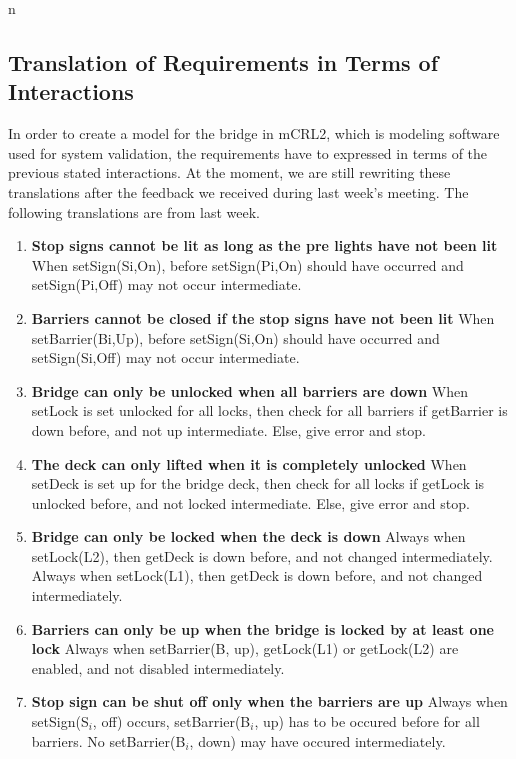 n\subsection{Translation of Requirements in Terms of Interactions}

In order to create a model for the bridge in mCRL2, which is modeling software used for system validation, the requirements have to expressed in terms of the previous stated interactions. At the moment, we are still rewriting these translations after the feedback we received during last week's meeting. The following translations are from last week.

\begin{enumerate}
	\item \textbf{Stop signs cannot be lit as long as the pre lights have not been lit}
	When setSign(Si,On), before setSign(Pi,On) should have occurred and setSign(Pi,Off) may not occur intermediate.

	\item \textbf{Barriers cannot be closed if the stop signs have not been lit}
	When setBarrier(Bi,Up), before setSign(Si,On) should have occurred and setSign(Si,Off) may not occur intermediate.

	\item \textbf{Bridge can only be unlocked when all barriers are down}
	When setLock is set unlocked for all locks, then check for all barriers if getBarrier is down before, and not up intermediate.
	Else, give error and stop.

	\item	\textbf{The deck can only lifted when it is completely unlocked}
	When setDeck is set up for the bridge deck, then check for all locks if getLock is unlocked before, and not locked intermediate.
	Else, give error and stop.

	\item \textbf{Bridge can only be locked when the deck is down}
	Always when setLock(L2), then getDeck is down before, and not changed intermediately.
	Always when setLock(L1), then getDeck is down before, and not changed intermediately.

	\item \textbf{Barriers can only be up when the bridge is locked by at least one lock}
	Always when setBarrier(B, up), getLock(L1) or getLock(L2) are enabled, and not disabled intermediately.

	\item \textbf{Stop sign can be shut off only when the barriers are up}
	Always when setSign(S$_i$, off) occurs, setBarrier(B$_i$, up) has to be occured before for all barriers. No setBarrier(B$_i$, down) may have occured intermediately.


\end{enumerate}
